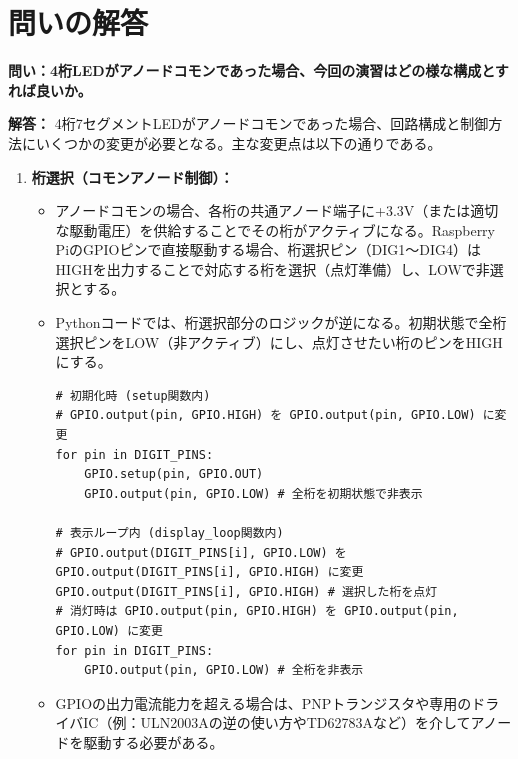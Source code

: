 \documentclass[a4paper,11pt,dvipdfmx]{jsarticle}
\begin{document}
\section{問いの解答}
\textbf{問い：4桁LEDがアノードコモンであった場合、今回の演習はどの様な構成とすれば良いか。}

\textbf{解答：}
4桁7セグメントLEDがアノードコモンであった場合、回路構成と制御方法にいくつかの変更が必要となる。主な変更点は以下の通りである。

\begin{enumerate}
    \item \textbf{桁選択（コモンアノード制御）：}
    \begin{itemize}
        \item アノードコモンの場合、各桁の共通アノード端子に+3.3V（または適切な駆動電圧）を供給することでその桁がアクティブになる。Raspberry PiのGPIOピンで直接駆動する場合、桁選択ピン（DIG1〜DIG4）はHIGHを出力することで対応する桁を選択（点灯準備）し、LOWで非選択とする。
        \item Pythonコードでは、桁選択部分のロジックが逆になる。初期状態で全桁選択ピンをLOW（非アクティブ）にし、点灯させたい桁のピンをHIGHにする。
        \begin{verbatim}
# 初期化時 (setup関数内)
# GPIO.output(pin, GPIO.HIGH) を GPIO.output(pin, GPIO.LOW) に変更
for pin in DIGIT_PINS:
    GPIO.setup(pin, GPIO.OUT)
    GPIO.output(pin, GPIO.LOW) # 全桁を初期状態で非表示

# 表示ループ内 (display_loop関数内)
# GPIO.output(DIGIT_PINS[i], GPIO.LOW) を GPIO.output(DIGIT_PINS[i], GPIO.HIGH) に変更
GPIO.output(DIGIT_PINS[i], GPIO.HIGH) # 選択した桁を点灯
# 消灯時は GPIO.output(pin, GPIO.HIGH) を GPIO.output(pin, GPIO.LOW) に変更
for pin in DIGIT_PINS:
    GPIO.output(pin, GPIO.LOW) # 全桁を非表示
        \end{verbatim}
        \item GPIOの出力電流能力を超える場合は、PNPトランジスタや専用のドライバIC（例：ULN2003Aの逆の使い方やTD62783Aなど）を介してアノードを駆動する必要がある。
    \end{itemize}


\end{enumerate}
\end{document}
